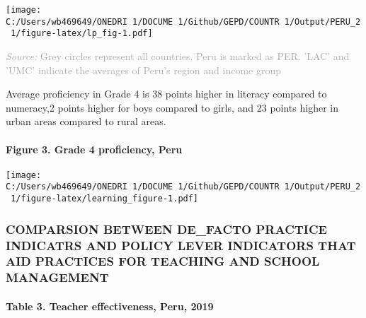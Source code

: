 \documentclass[twocolumn]{article}
\let\oldparagraph\paragraph
\renewcommand{\paragraph}[1]{\oldparagraph{#1}\mbox{}}
\begin{document}
\texttt{[image: C:/Users/wb469649/ONEDRI~1/DOCUME~1/Github/GEPD/COUNTR~1/Output/PERU\_2~1/figure-latex/lp\_fig-1.pdf]}

{\scriptsize
    \textcolor{darkgray}{\textit{Source:} Grey circles represent all countries. Peru is marked as PER. 'LAC' and 'UMC' indicate the averages of Peru's region and income group}
  }

Average proficiency in Grade 4 is 38 points higher in literacy compared
to numeracy,2 points higher for boys compared to girls, and 23 points
higher in urban areas compared to rural areas.\\
\vfill\null

\hypertarget{figure-3.-grade-4-proficiency-peru}{%
\paragraph{Figure 3. Grade 4 proficiency,
Peru}\label{figure-3.-grade-4-proficiency-peru}}

\texttt{[image: C:/Users/wb469649/ONEDRI~1/DOCUME~1/Github/GEPD/COUNTR~1/Output/PERU\_2~1/figure-latex/learning\_figure-1.pdf]}

\hypertarget{comparsion-between-de_facto-practice-indicatrs-and-policy-lever-indicators-that-aid-practices-for-teaching-and-school-management}{%
\subsubsection{\texorpdfstring{\textbf{COMPARSION BETWEEN DE\_FACTO
PRACTICE INDICATRS AND POLICY LEVER INDICATORS THAT AID PRACTICES FOR
TEACHING AND SCHOOL
MANAGEMENT}}{COMPARSION BETWEEN DE\_FACTO PRACTICE INDICATRS AND POLICY LEVER INDICATORS THAT AID PRACTICES FOR TEACHING AND SCHOOL MANAGEMENT}}\label{comparsion-between-de_facto-practice-indicatrs-and-policy-lever-indicators-that-aid-practices-for-teaching-and-school-management}}

\hypertarget{table-3.-teacher-effectiveness-peru-2019}{%
\paragraph{Table 3. Teacher effectiveness, Peru,
2019}\label{table-3.-teacher-effectiveness-peru-2019}}
\end{document}
